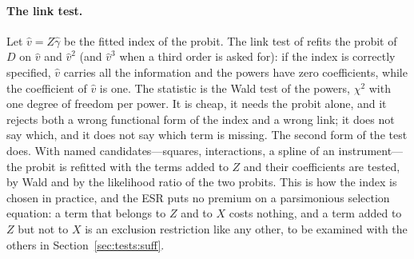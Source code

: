 \documentclass[11pt,a4paper]{article}
\theoremstyle{plain}
\theoremstyle{definition}
\theoremstyle{remark}
\newcommand{\1}{\mathbf{1}}
\begin{document}
\paragraph{The link test.}
Let $\hat v=Z\hat\gamma$ be the fitted index of the probit. The link test
of \citet{pregibon1980} refits the probit of $D$ on $\hat v$ and
$\hat v^2$ (and $\hat v^3$ when a third order is asked for): if the index
is correctly specified, $\hat v$ carries all the information and the
powers have zero coefficients, while the coefficient of $\hat v$ is one.
The statistic is the Wald test of the powers, $\chi^2$ with one degree
of freedom per power. It is cheap, it needs the probit alone, and it
rejects both a wrong functional form of the index and a wrong link; it
does not say which, and it does not say which term is missing. The
second form of the test does. With named candidates---squares,
interactions, a spline of an instrument---the probit is refitted with
the terms added to $Z$ and their coefficients are tested, by Wald and by
the likelihood ratio of the two probits. This is how the index is
chosen in practice, and the ESR puts no premium on a parsimonious
selection equation: a term that belongs to $Z$ and to $X$ costs nothing,
and a term added to $Z$ but not to $X$ is an exclusion restriction like
any other, to be examined with the others in
Section~\ref{sec:tests:suff}.
\end{document}
